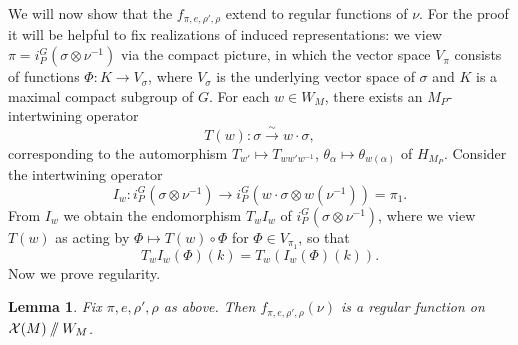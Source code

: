 \documentclass[10pt]{article}
\newcommand{\git}{\mathbin{
  \mathchoice{/\mkern-6mu/}%
    {/\mkern-6mu/}%
    {/\mkern-5mu/}%
    {/\mkern-5mu/}}}%
\newcommand{\X}{\mathcal{X}}
\newtheorem{lem}{Lemma}
\theoremstyle{definition}
\theoremstyle{remark}
\begin{document}
We will now show that the $f_{\pi,e,\rho',\rho}$ extend to regular functions of $\nu$. For the proof
it will be helpful to fix realizations of induced representations: we view
$\pi=i_P^G(\sigma\otimes\nu^{-1})$ via the compact picture, in which the vector space 
$V_\pi$ consists of functions $\Phi\colon K\to V_\sigma$, where $V_\sigma$ is the underlying vector space of 
$\sigma$ and $K$ is a maximal compact subgroup of $G$. For each $w\in W_M$, there exists an $M_P$-
intertwining operator 
%
\[
T(w)\colon\sigma\overset{\sim}{\to}w\cdot\sigma,
\]
%
corresponding to the automorphism $T_{w'}\mapsto T_{ww'w^{-1}}$, $\theta_\alpha\mapsto \theta_{w(\alpha)}$
of $H_{M_P}$. Consider the intertwining operator 
%
\[
I_w\colon i_P^G(\sigma\otimes\nu^{-1})\to i_P^G(w\cdot\sigma\otimes w(\nu^{-1}))=\pi_1.
\]
%
From $I_w$ we obtain the endomorphism $T_wI_w$ of $ i_P^G(\sigma\otimes\nu^{-1})$, where we view $T(w)$ 
as acting by $\Phi\mapsto T(w)\circ \Phi$ for $\Phi\in V_{\pi_1}$, so that 
%
\[
T_wI_w(\Phi)(k)=T_w\left(I_w(\Phi)(k)\right).
\]
%
Now we prove regularity.
%
\begin{lem}
\label{lem regularity of matrix coefficients}
Fix $\pi, e,\rho',\rho$ as above. Then $f_{\pi,e,\rho',\rho}(\nu)$ is a regular function on $\X(M)\git W_M$.
\end{lem}
%
\end{document}
